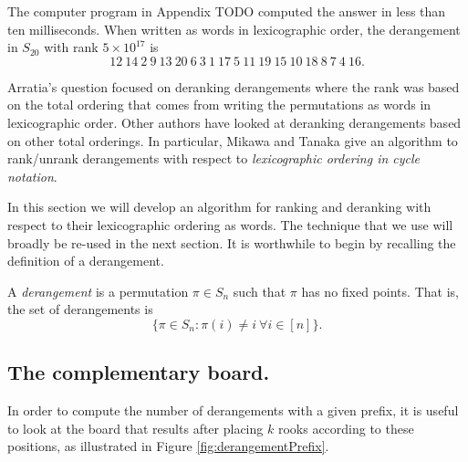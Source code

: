 \begin{answer}
The computer program in Appendix TODO computed the answer in less than ten
milliseconds. When written as words in lexicographic order, the
derangement in $S_{20}$ with rank $5 \times 10^{17}$ is \[
  12\ 14\ 2\ 9\ 13\ 20\ 6\ 3\ 1\ 17\ 5\ 11\ 19\ 15\ 10\ 18\ 8\ 7\ 4\ 16.
\]
\end{answer}

Arratia's question focused on deranking derangements where the rank was
based on the total ordering that comes from writing the
permutations as words in lexicographic order.
Other authors have looked at deranking derangements based on other total
orderings. In particular, Mikawa and Tanaka \cite{Mikawa2014} give an algorithm
to rank/unrank derangements
with respect to \textit{lexicographic ordering in cycle notation}.

In this section we will develop an algorithm for ranking and deranking with
respect to their lexicographic ordering as words. The technique that we use will
broadly be re-used in the next section.
It is worthwhile to begin by recalling the definition of a derangement.
\begin{definition}
  A \textit{derangement} is a permutation $\pi \in S_n$ such that $\pi$ has no
  fixed points. That is, the set of derangements is \[
    \{\pi \in S_n : \pi(i) \neq i\ \forall i \in [n]\}.
  \]
\end{definition}

\subsection{The complementary board.}
In order to compute the number of derangements with a given prefix, it is
useful to look at the board that results after placing $k$ rooks according to
these positions, as illustrated in Figure \ref{fig:derangementPrefix}.



